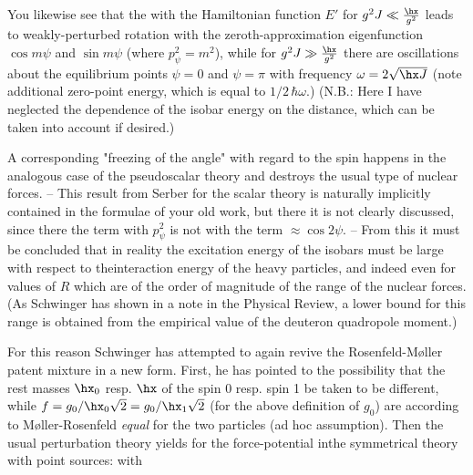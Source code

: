 You likewise see that the  with the Hamiltonian function $E'$ for $g^2 J \ll\frac{\hx}{g^2}$ leads to weakly-perturbed rotation with the zeroth-approximation eigenfunction $\cos{m\psi}$ and $\sin{m\psi}$ (where $p_\psi^2 = m^2$), while for $g^2 J \gg \frac{\hx}{g^2}$ there are oscillations about the equilibrium points $\psi=0$ and $\psi=\pi$ with frequency $\omega=2\sqrt{\hx J}$ (note additional zero-point energy, which is equal to $1/2\,\hbar\omega$.) (N.B.: Here I have neglected the dependence of the isobar energy on the distance, which can be taken into account if desired.)

A corresponding "freezing of the angle" with regard to the spin happens in the analogous case of the pseudoscalar theory and destroys the usual type of nuclear forces. -- This result from Serber for the scalar theory is naturally implicitly contained in the formulae of your old work, but there it is not clearly discussed, since there the term with $p_\psi^2$ is not  with the term $\approx\cos{2\psi}$. -- From this it must be concluded that in reality the excitation energy of the isobars must be large with respect to theinteraction energy of the heavy particles, and indeed even for values of $R$ which are of the order of magnitude of the range of the nuclear forces. (As Schwinger has shown in a note in the Physical Review, a lower bound for this range is obtained from the empirical value of the deuteron quadropole moment.) 

For this reason Schwinger has attempted to again revive the Rosenfeld-Møller patent mixture in a new form. First, he has pointed to the possibility that the rest masses $\hx_0$ resp. $\hx$ of the spin 0 resp. spin 1 be taken to be different, while $f=g_0/\hx_0\sqrt{2} = g_0/\hx_1\sqrt{2}$ (for the above definition of $g_0$) are according to Møller-Rosenfeld \textit{equal} for the two particles (ad hoc assumption). Then the usual perturbation theory yields for the force-potential inthe symmetrical theory with point sources:
with

